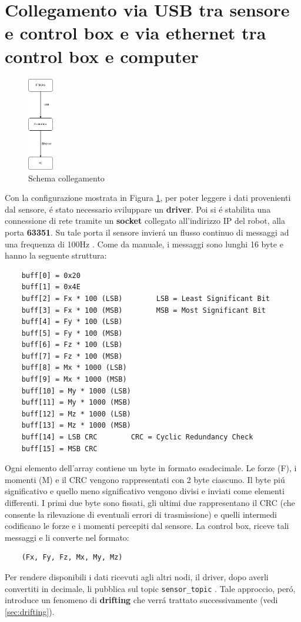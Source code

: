 \section{Collegamento via USB tra sensore e control box e via ethernet tra control box e computer} \label{sec:scp}
\begin{figure}[H]
    \centering
    \includegraphics*[width=0.1\textwidth]{images/ft-cbox-pc.png}
    \caption{Schema collegamento}
    \label{fig:ft-cbox-pc}
\end{figure}
Con la configurazione mostrata in Figura \ref{fig:ft-cbox-pc}, per poter leggere i dati provenienti dal sensore, \'{e} stato 
necessario sviluppare un \textbf{driver}. 
Poi si \'{e} stabilita una connessione di rete tramite un \textbf{socket} collegato all'indirizzo IP del robot, 
alla porta \textbf{63351}. 
Su tale porta il sensore invier\'{a} un flusso continuo di messaggi ad una frequenza di 100Hz \cite{ft_sensor}. 
Come da manuale, i messaggi sono lunghi 16 byte e hanno la seguente struttura: 
\begin{verbatim}
    buff[0] = 0x20
    buff[1] = 0x4E
    buff[2] = Fx * 100 (LSB)        LSB = Least Significant Bit
    buff[3] = Fx * 100 (MSB)        MSB = Most Significant Bit
    buff[4] = Fy * 100 (LSB)
    buff[5] = Fy * 100 (MSB)
    buff[6] = Fz * 100 (LSB)
    buff[7] = Fz * 100 (MSB)
    buff[8] = Mx * 1000 (LSB)
    buff[9] = Mx * 1000 (MSB)
    buff[10] = My * 1000 (LSB)
    buff[11] = My * 1000 (MSB)
    buff[12] = Mz * 1000 (LSB)
    buff[13] = Mz * 1000 (MSB)
    buff[14] = LSB CRC        CRC = Cyclic Redundancy Check
    buff[15] = MSB CRC
\end{verbatim} 
Ogni elemento dell'array contiene un byte in formato esadecimale. 
Le forze (F), i momenti (M) e il CRC vengono rappresentati con 2 byte ciascuno. Il byte pi\'{u} significativo e quello meno significativo 
vengono divisi e inviati come elementi differenti.
I primi due byte sono fissati, gli ultimi due rappresentano il CRC (che consente la rilevazione di eventuali errori di 
trasmissione) e quelli intermedi codificano le forze e i momenti percepiti dal sensore. 
La control box, riceve tali messaggi e li converte nel formato:
\begin{verbatim}
    (Fx, Fy, Fz, Mx, My, Mz)
\end{verbatim}
Per rendere disponibili i dati ricevuti agli altri nodi, il driver, dopo averli convertiti in decimale, li pubblica sul 
topic \verb|sensor_topic| \cite{ft_driver}. Tale approccio, per\'{o}, introduce un fenomeno di \textbf{drifting} che verr\'{a} 
trattato successivamente (vedi \ref{sec:drifting}).
